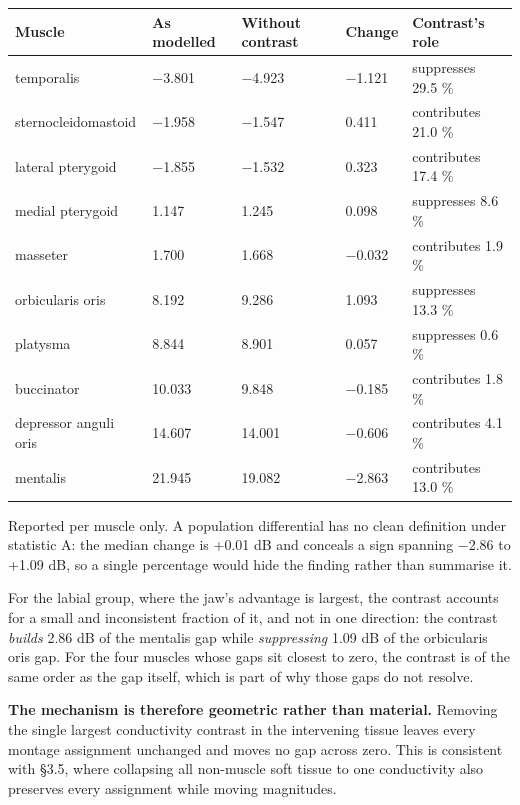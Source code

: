 \documentclass[
  11pt,
]{article}
\newcounter{none} %
\begin{document}
{\def\LTcaptype{none} %
\begin{longtable}[]{@{}lllll@{}}
\toprule\noalign{}
Muscle & As modelled & Without contrast & Change & Contrast's role \\
\midrule\noalign{}
\endhead
\bottomrule\noalign{}
\endlastfoot
temporalis & −3.801 & −4.923 & −1.121 & suppresses 29.5 \% \\
sternocleidomastoid & −1.958 & −1.547 & 0.411 & contributes 21.0 \% \\
lateral pterygoid & −1.855 & −1.532 & 0.323 & contributes 17.4 \% \\
medial pterygoid & 1.147 & 1.245 & 0.098 & suppresses 8.6 \% \\
masseter & 1.700 & 1.668 & −0.032 & contributes 1.9 \% \\
orbicularis oris & 8.192 & 9.286 & 1.093 & suppresses 13.3 \% \\
platysma & 8.844 & 8.901 & 0.057 & suppresses 0.6 \% \\
buccinator & 10.033 & 9.848 & −0.185 & contributes 1.8 \% \\
depressor anguli oris & 14.607 & 14.001 & −0.606 & contributes 4.1 \% \\
mentalis & 21.945 & 19.082 & −2.863 & contributes 13.0 \% \\
\end{longtable}
}

Reported per muscle only. A population differential has no clean definition
under statistic A: the median change is +0.01 dB and conceals a sign spanning
−2.86 to +1.09 dB, so a single percentage would hide the finding rather than
summarise it.

For the labial group, where the jaw's advantage is largest, the contrast
accounts for a small and inconsistent fraction of it, and not in one direction:
the contrast \emph{builds} 2.86 dB of the mentalis gap while \emph{suppressing} 1.09 dB of
the orbicularis oris gap. For the four muscles
whose gaps sit closest to zero, the contrast is of the same order as the gap
itself, which is part of why those gaps do not resolve.

\textbf{The mechanism is therefore geometric rather than material.} Removing the
single largest conductivity contrast in the intervening tissue leaves every
montage assignment unchanged and moves no gap across zero. This is consistent
with §3.5, where collapsing all non-muscle soft tissue to one conductivity also
preserves every assignment while moving magnitudes.
\end{document}
